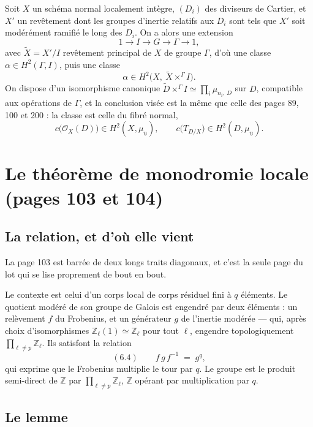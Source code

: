 \documentclass[11pt,a4paper]{article}
\begin{document}
Soit $X$ un schéma normal localement intègre, $(D_{i})$ des diviseurs de
Cartier, et $X'$ un revêtement dont les groupes d'inertie relatifs aux $D_{i}$
sont tels que $X'$ soit modérément ramifié le long des $D_{i}$. On a alors une
extension
\[
  1 \longrightarrow I \longrightarrow G \longrightarrow \Gamma
  \longrightarrow 1 ,
\]
avec $\tilde{X} = X'/I$ revêtement principal de $X$ de groupe $\Gamma$, d'où
une classe $\alpha \in H^{2}(\Gamma, I)$, puis une classe
\[
  \alpha \in H^{2}\bigl(X,\ \tilde{X} \times^{\Gamma} I\bigr) .
\]
On dispose d'un isomorphisme canonique
$\tilde{D} \times^{\Gamma} I \simeq \prod_{i} \mu_{n_{i},\,D}$ sur $D$,
compatible aux opérations de $\Gamma$, et la conclusion visée est la même que
celle des pages 89, 100 et 200 : la classe est celle du fibré normal,
\[
  c\bigl(\mathcal{O}_{X}(D)\bigr) \in H^{2}(X, \mu_{\underline{n}}) ,
  \qquad
  c\bigl(T_{D/X}\bigr) \in H^{2}(D, \mu_{\underline{n}}) .
\]

\section*{Le théorème de monodromie locale (pages 103 et 104)}

\subsection*{La relation, et d'où elle vient}

La page 103 est barrée de deux longs traits diagonaux, et c'est la seule page
du lot qui se lise proprement de bout en bout.

Le contexte est celui d'un corps local de corps résiduel fini à $q$ éléments.
Le quotient modéré de son groupe de Galois est engendré par deux éléments : un
relèvement $f$ du Frobenius, et un générateur $g$ de l'inertie modérée --- qui,
après choix d'isomorphismes $\mathbb{Z}_{\ell}(1) \simeq \mathbb{Z}_{\ell}$
pour tout $\ell$, engendre topologiquement
$\prod_{\ell \neq p} \mathbb{Z}_{\ell}$. Ils satisfont la relation
\[
  (6.4) \qquad f\,g\,f^{-1} \;=\; g^{q} ,
\]
qui exprime que le Frobenius multiplie le tour par $q$. Le groupe est le
produit semi-direct de $\mathbb{Z}$ par $\prod_{\ell\neq p}\mathbb{Z}_{\ell}$,
$\mathbb{Z}$ opérant par multiplication par $q$.

\subsection*{Le lemme}
\end{document}

